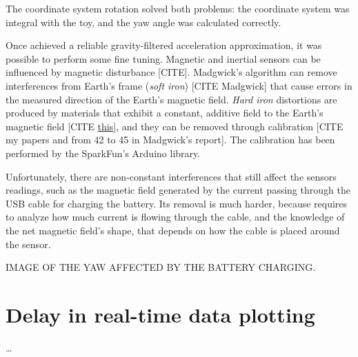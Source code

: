 The coordinate system rotation solved both problems: the coordinate system was integral with the toy, and the yaw angle was calculated correctly.
\bigbreak

Once achieved a reliable gravity-filtered acceleration approximation, it was possible to perform some fine tuning. Magnetic and inertial sensors can be influenced by magnetic disturbance [CITE]. Madgwick's algorithm can remove interferences from Earth's frame (\textit{soft iron}) [CITE Madgwick] that cause errors in the measured direction of the Earth's magnetic field. \textit{Hard iron} distortions are produced by materials that exhibit a constant, additive field to the Earth's magnetic field [CITE \href{https://www.fierceelectronics.com/components/compensating-for-tilt-hard-iron-and-soft-iron-effects}{this}], and they can be removed through calibration [CITE my papers and from 42 to 45 in Madgwick's report]. The calibration has been performed by the SparkFun's Arduino library.

Unfortunately, there are non-constant interferences that still affect the sensors readings, such as the magnetic field generated by the current passing through the USB cable for charging the battery.
Its removal is much harder, because requires to analyze how much current is flowing through the cable, and the knowledge of the net magnetic field's shape, that depends on how the cable is placed around the sensor.
\bigbreak

IMAGE OF THE YAW AFFECTED BY THE BATTERY CHARGING.

\section{Delay in real-time data plotting}
\dots
